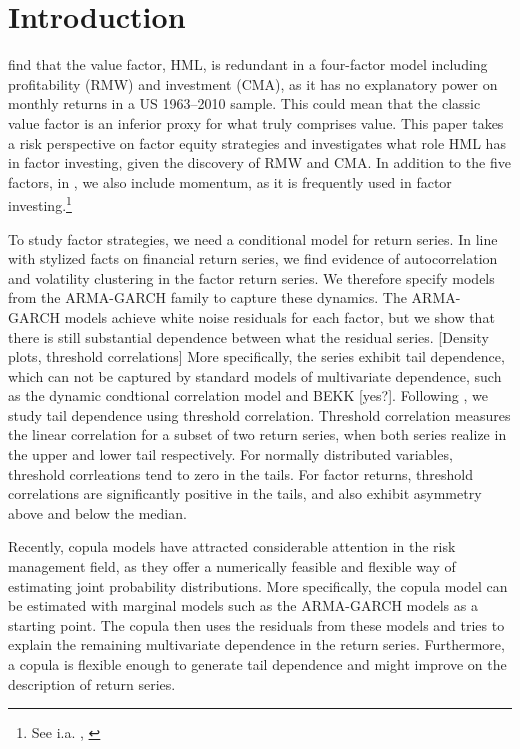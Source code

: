 \section{Introduction}
\textcite{FF2015} find that the value factor, HML, is redundant in a four-factor model including profitability (RMW) and investment (CMA), as it has no explanatory power on monthly returns in a US 1963–2010 sample. This could mean that the classic value factor is an inferior proxy for what truly comprises value. This paper takes a risk perspective on factor equity strategies and investigates what role HML has in factor investing, given the discovery of RMW and CMA. In addition to the five factors, in \textcite{FF2015}, we also include momentum, as it is frequently used in factor investing.\footnote{See i.a. \textcite{Pedersen2015}, \textcite{Ilmanen2011}}

To study factor strategies, we need a conditional model for return series. In line with stylized facts on financial return series, we find evidence of autocorrelation and volatility clustering in the factor return series. We therefore specify models from the ARMA-GARCH family to capture these dynamics. The ARMA-GARCH models achieve white noise residuals for each factor, but we show that there is still substantial dependence between what the residual series. [Density plots, threshold correlations] More specifically, the series exhibit tail dependence, which can not be captured by standard models of multivariate dependence, such as the dynamic condtional correlation model \textcite{Engle2002} and BEKK [yes?]. Following \textcite{AngChen2002}, we study tail dependence using threshold correlation. Threshold correlation measures the linear correlation for a subset of two return series, when both series realize in the upper and lower tail respectively. For normally distributed variables, threshold corrleations tend to zero in the tails. For factor returns, threshold correlations are significantly positive in the tails, and also exhibit asymmetry above and below the median.

Recently, copula models have attracted considerable attention in the risk management field, as they offer a numerically feasible and flexible way of estimating joint probability distributions. More specifically, the copula model can be estimated with marginal models such as the ARMA-GARCH models as a starting point. The copula then uses the residuals from these models and tries to explain the remaining multivariate dependence in the return series. Furthermore, a copula is flexible enough to generate tail dependence and might improve on the description of return series.

